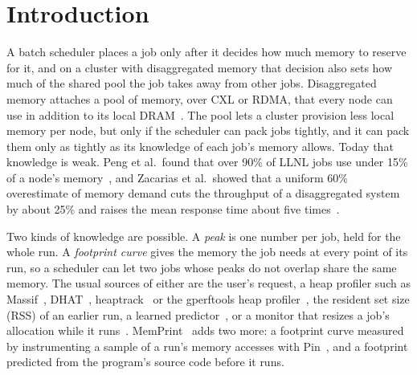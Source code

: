 \documentclass[11pt]{article}
\newcommand{\memprint}{MemPrint}
\newcommand{\term}[1]{\emph{#1}}
\begin{document}
\begin{abstract}
against the resident set without code it matches the exact peak (422 against 429 minutes); a curve still gains
nothing over a peak there, because the allocator keeps freed memory resident. We also evaluate three published
policies, checked against their authors' code where it is published. Pond, which holds a job's request and places
its predicted untouched memory in the pool, is slower than the request itself (2{,}519 minutes), because the pool
fills first. KS+, which learns a step function over time from the program's other inputs, gives 1{,}262 minutes:
its regressions extrapolate well for most programs but predict almost nothing for two, whose jobs then fail dozens
of times. Dynamic provisioning, which resizes a running job every five minutes to the coming five minutes of its
use, gives 457 minutes, between \memprint{}'s curve and the exact peak, but only because it reads that use from the
trace, and it restarts about 300 jobs per stream; a variant that knows only the past, as a running system does,
gives 504 minutes, behind both. An appendix repeats every result at offered loads from 0.4 to 1.2.
\end{abstract}

\section{Introduction}
\label{sec:intro}

A batch scheduler places a job only after it decides how much memory to reserve for it, and on a cluster
with disaggregated memory that decision also sets how much of the shared pool the job takes away from other
jobs. Disaggregated memory attaches a pool of memory, over CXL or RDMA, that every node can use in addition to
its local DRAM~\cite{Li2023Pond,Zacarias2021Throughput}. The pool lets a cluster provision less local memory per
node, but only if the scheduler can pack jobs tightly, and it can pack them only as tightly as its knowledge
of each job's memory allows. Today that knowledge is weak. Peng et al.\ found that over 90\% of LLNL jobs use
under 15\% of a node's memory~\cite{Peng2020Underutilization}, and Zacarias et al.\ showed that a uniform 60\%
overestimate of memory demand cuts the throughput of a disaggregated system by about 25\% and raises the mean
response time about five times~\cite{Zacarias2021Accurate}.

Two kinds of knowledge are possible. A \term{peak} is one number per job, held for the whole run. A
\term{footprint curve} gives the memory the job needs at every point of its run, so a scheduler can let two
jobs whose peaks do not overlap share the same memory. The usual sources of either are the user's request,
a heap profiler such as Massif~\cite{ValgrindMassif}, DHAT~\cite{ValgrindDHAT}, heaptrack~\cite{heaptrack}
or the gperftools heap profiler~\cite{gperftools}, the resident set size (RSS) of an earlier run, a learned
predictor~\cite{Li2023Pond}, or a monitor that resizes a job's allocation while it
runs~\cite{Zacarias2023Dynamic}. \memprint{}~\cite{memprint} adds two more: a footprint curve measured by
instrumenting a sample of a run's memory accesses with Pin~\cite{Luk2005Pin}, and a footprint predicted from
the program's source code before it runs.
\end{document}

